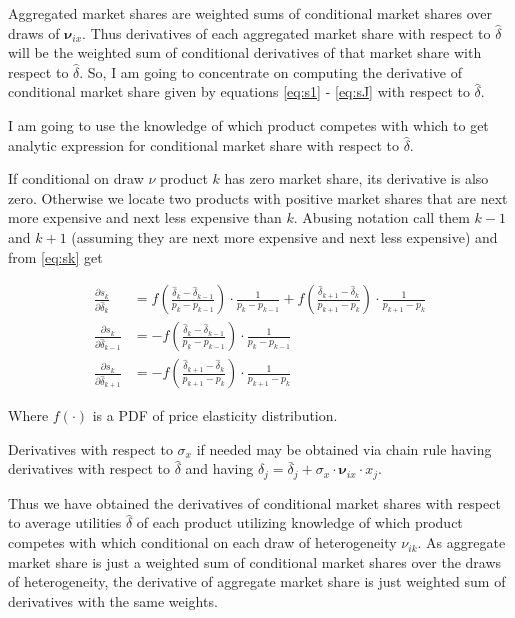 \documentclass[12pt,letterpaper]{article}
\begin{document}
	Aggregated market shares are weighted sums of conditional market shares over draws of $\boldsymbol{\nu}_{ix}$. Thus derivatives of each aggregated market share with respect to $\hat\delta$ will be the weighted sum of conditional derivatives of that market share with respect to $\hat \delta$. So, I am going to concentrate on computing the derivative of conditional market share given by equations \ref{eq:s1} - \ref{eq:sJ} with respect to $\hat{\delta}$.
	
	I am going to use the knowledge of which product competes with which to get analytic expression for conditional market share with respect to $\hat\delta$. 
	
	If conditional on draw $\nu$ product $k$ has zero market share, its derivative is also zero. Otherwise we locate two products with positive market shares that are next more expensive and next less expensive than $k$. Abusing notation call them $k-1$ and $k+1$ (assuming they are next more expensive and next less expensive) and from \ref{eq:sk} get
	
	\begin{align}
	\frac{\partial s_k}{\partial \hat \delta_k} &= f\left(\frac{\hat\delta_k - \hat\delta_{k-1}}{p_k - p_{k-1}}\right)\cdot \frac 1{p_k - p_{k-1}} + f\left(\frac{\hat\delta_{k+1} - \hat\delta_{k}}{p_{k+1} - p_{k}}\right)\cdot \frac 1{p_{k+1} - p_{k}} \\
	\frac{\partial s_k}{\partial \hat \delta_{k-1}} &= -f\left(\frac{\hat\delta_k - \hat\delta_{k-1}}{p_k - p_{k-1}}\right)\cdot \frac 1{p_k - p_{k-1}} \\
	\frac{\partial s_k}{\partial \hat \delta_{k+1}} &= -f\left(\frac{\hat\delta_{k+1} - \hat\delta_{k}}{p_{k+1} - p_{k}}\right) \cdot \frac 1{p_{k+1} - p_{k}}
	\end{align}
	
	Where $f(\cdot)$ is a PDF of price elasticity distribution.
	
	Derivatives with respect to $\sigma_{x}$ if needed may be obtained via chain rule having derivatives with respect to $\hat{\delta}$ and having $\hat \delta_j = {\bar \delta_j} + \sigma_x \cdot \boldsymbol{\nu}_{ix} \cdot x_j$. 
	
	Thus we have obtained the derivatives of conditional market shares with respect to average utilities $\hat \delta$ of each product utilizing knowledge of which product competes with which conditional on each draw of heterogeneity $\nu_{ik}$. As aggregate market share is just a weighted sum of conditional market shares over the draws of heterogeneity, the derivative of aggregate market share is just weighted sum of derivatives with the same weights. 
	
\end{document}
